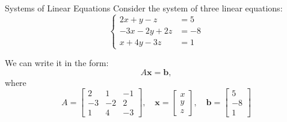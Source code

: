 \documentclass{beamer}
\newcommand{\vb}{\mathbf{b}}
\newcommand{\vx}{\mathbf{x}}
\begin{document}
\begin{frame}{Systems of Linear Equations}
    Consider the system of three linear equations:
 \[ \begin{cases}
      2x+y-z&=5\\
      -3x-2y+2z&=-8\\
      x+4y-3z&=1
  \end{cases}\]
  
\pause

We can write it in the form:
\[ A\vx = \vb, \]
where
\[ A = \begin{bmatrix}
     2 & 1 & -1 \\
    -3 & -2 & 2  \\
    1 & 4 & -3 
\end{bmatrix},\quad \vx = \begin{bmatrix}
    x\\y\\z
\end{bmatrix},\quad \vb = \begin{bmatrix}
    5\\-8\\1
\end{bmatrix} \]


  


\end{frame}
\end{document}
